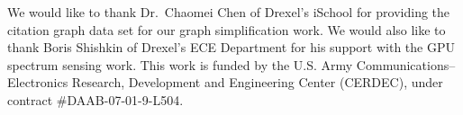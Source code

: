\begin{acknowledgments} 
We would like to thank Dr.~Chaomei Chen of Drexel's iSchool for providing the citation graph data set for our graph simplification work.  We would also like to thank Boris Shishkin of Drexel's ECE Department for his support with the GPU spectrum sensing work.  This work is funded by the U.S. Army Communications--Electronics Research, Development and Engineering Center (CERDEC), under contract \#DAAB-07-01-9-L504.
\end{acknowledgments}

